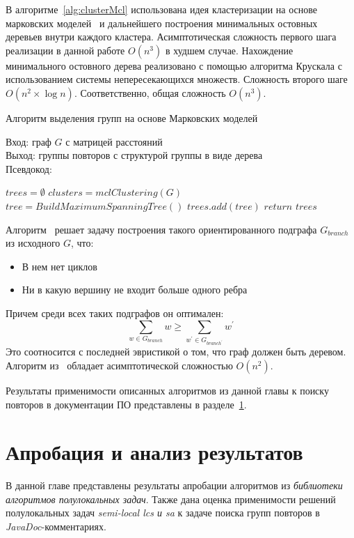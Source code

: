 В алгоритме~\ref{alg:clusterMcl} использована идея кластеризации на основе марковских моделей~\cite{dongen2000cluster} и дальнейшего построения минимальных остовных деревьев внутри каждого кластера.
 Асимптотическая сложность первого шага реализации в данной работе $O(n^3)$ в худшем случае.
 Нахождение минимального остовного дерева реализовано с помощью алгоритма Крускала с использованием системы непересекающихся множеств. Сложность второго шаге $O(n^2 \times \log n)$.
 Соответственно, общая сложность $O(n^3)$.

\begin{algorithm}[t!]
\caption{Алгоритм выделения групп на основе Марковских моделей}\label{alg:clusterMcl}
Вход: граф $G$ с матрицей расстояний\\
Выход: группы повторов с структурой группы в виде дерева\\
Псевдокод:
\begin{algorithmic}[1]
\State $trees = \emptyset$
\State $ clusters = mclClustering(G)$
\State $tree =  BuildMaximumSpanningTree()$
\State $trees.add(tree)$
\EndFor
\State
\State $return$ $trees$
\end{algorithmic}
\end{algorithm}


Алгоритм~\cite{tofigh2009optimum}  решает задачу построения такого ориентированного подграфа $G_{branch}$ из исходного $G$, что:
\begin{itemize}
    \item В нем нет циклов
    \item Ни в какую вершину не входит больше одного ребра
\end{itemize}
Причем среди всех таких подграфов он оптимален:
\begin{equation}
\sum_{w \in G_{branch}} w \geq \sum_{w^{'} \in G_{branch^{'}}} w^{'}
\end{equation}
Это соотносится с последней эвристикой о том, что граф должен быть деревом.
Алгоритм из~\cite{tofigh2009optimum} обладает асимптотической сложностью $O(n^2)$.

%  

\vspace{10 mm}
Результаты применимости описанных алгоритмов из  данной главы к поиску повторов в документации ПО представлены в разделе~\ref{appob}.

\section{Апробация и анализ результатов}\label{appob}
В данной главе представлены результаты апробации алгоритмов из \emph{библиотеки алгоритмов полулокальных задач}.
Также дана оценка применимости решений полулокальных задач \emph{semi-local lcs и sa} к задаче поиска групп повторов в \emph{JavaDoc}-комментариях.


